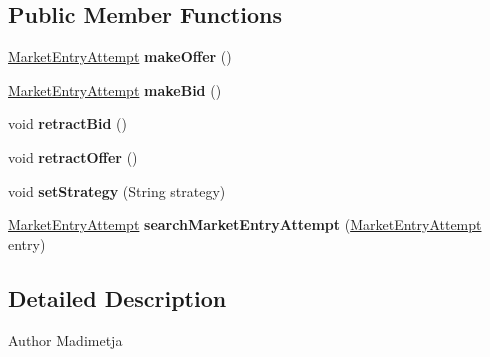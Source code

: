 \subsection*{Public Member Functions}
\begin{DoxyCompactItemize}
\item 
\hypertarget{interfacefinancialmarketsimulator_1_1_trade_aba2e7742e3c7a477417abb741eb049af}{\hyperlink{classfinancialmarketsimulator_1_1_market_entry_attempt}{Market\+Entry\+Attempt} {\bfseries make\+Offer} ()}\label{interfacefinancialmarketsimulator_1_1_trade_aba2e7742e3c7a477417abb741eb049af}

\item 
\hypertarget{interfacefinancialmarketsimulator_1_1_trade_ab84e578afb7f519b018ebc0ffaab4d2a}{\hyperlink{classfinancialmarketsimulator_1_1_market_entry_attempt}{Market\+Entry\+Attempt} {\bfseries make\+Bid} ()}\label{interfacefinancialmarketsimulator_1_1_trade_ab84e578afb7f519b018ebc0ffaab4d2a}

\item 
\hypertarget{interfacefinancialmarketsimulator_1_1_trade_a22d67d3c44faaf8fca8a4fd2d78a3e75}{void {\bfseries retract\+Bid} ()}\label{interfacefinancialmarketsimulator_1_1_trade_a22d67d3c44faaf8fca8a4fd2d78a3e75}

\item 
\hypertarget{interfacefinancialmarketsimulator_1_1_trade_a1a1cbe142a99ac5e08872efea02239f7}{void {\bfseries retract\+Offer} ()}\label{interfacefinancialmarketsimulator_1_1_trade_a1a1cbe142a99ac5e08872efea02239f7}

\item 
\hypertarget{interfacefinancialmarketsimulator_1_1_trade_aa3cfc0cff8e9a08e48cfd70ae870cb8b}{void {\bfseries set\+Strategy} (String strategy)}\label{interfacefinancialmarketsimulator_1_1_trade_aa3cfc0cff8e9a08e48cfd70ae870cb8b}

\item 
\hypertarget{interfacefinancialmarketsimulator_1_1_trade_a2635502a77913bfa79d6a953ee7c3c1f}{\hyperlink{classfinancialmarketsimulator_1_1_market_entry_attempt}{Market\+Entry\+Attempt} {\bfseries search\+Market\+Entry\+Attempt} (\hyperlink{classfinancialmarketsimulator_1_1_market_entry_attempt}{Market\+Entry\+Attempt} entry)}\label{interfacefinancialmarketsimulator_1_1_trade_a2635502a77913bfa79d6a953ee7c3c1f}

\end{DoxyCompactItemize}


\subsection{Detailed Description}
\begin{DoxyAuthor}{Author}
Madimetja 
\end{DoxyAuthor}


